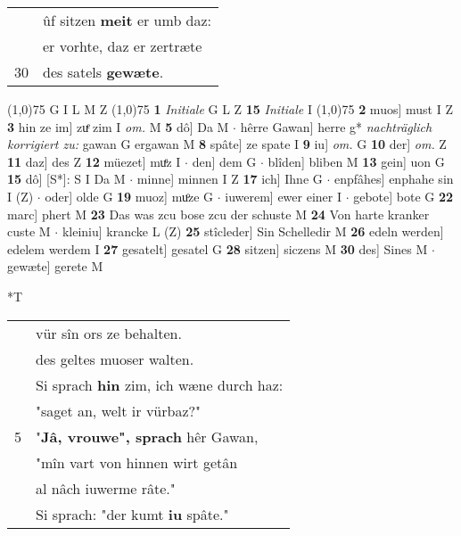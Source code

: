 \documentclass[8pt,a4paper,notitlepage]{article}
\begin{document}
\begin{table}[ht]
\begin{minipage}[t]{0.5\linewidth}
\begin{tabular}{rl}
 & ûf sitzen \textbf{meit} er umb daz:\\ 
 & er vorhte, daz er zertræte\\ 
30 & des satels \textbf{gewæte}.\\ 
\end{tabular}
\scriptsize
\line(1,0){75} \newline
G I L M Z \newline
\line(1,0){75} \newline
\textbf{1} \textit{Initiale} G L Z  \textbf{15} \textit{Initiale} I  \newline
\line(1,0){75} \newline
\textbf{2} muos] must I Z \textbf{3} hin ze im] zuͤ zim I \textit{om.} M \textbf{5} dô] Da M  $\cdot$ hêrre Gawan] herre g* \textit{nachträglich korrigiert zu:} gawan G ergawan M \textbf{8} spâte] ze spate I \textbf{9} iu] \textit{om.} G \textbf{10} der] \textit{om.} Z \textbf{11} daz] des Z \textbf{12} müezet] muͤz I  $\cdot$ den] dem G  $\cdot$ blîden] bliben M \textbf{13} gein] uon G \textbf{15} dô] [S*]: S I Da M  $\cdot$ minne] minnen I Z \textbf{17} ich] Ihne G  $\cdot$ enpfâhes] enphahe sin I (Z)  $\cdot$ oder] olde G \textbf{19} muoz] muͦze G  $\cdot$ iuwerem] ewer einer I  $\cdot$ gebote] bote G \textbf{22} marc] phert M \textbf{23} Das was zcu bose zcu der schuste M \textbf{24} Von harte kranker custe M  $\cdot$ kleiniu] krancke L (Z) \textbf{25} stîcleder] Sin Schelledir M \textbf{26} edeln werden] edelem werdem I \textbf{27} gesatelt] gesatel G \textbf{28} sitzen] siczens M \textbf{30} des] Sines M  $\cdot$ gewæte] gerete M \newline
\end{minipage}
\hspace{0.5cm}
\begin{minipage}[t]{0.5\linewidth}
\small
\begin{center}*T
\end{center}
\begin{tabular}{rl}
 & vür sîn ors ze behalten.\\ 
 & des geltes muoser walten.\\ 
 & Si sprach \textbf{hin} zim, ich wæne durch haz:\\ 
 & "saget an, welt ir vürbaz?"\\ 
5 & "\textbf{Jâ, vrouwe", sprach} hêr Gawan,\\ 
 & "mîn vart von hinnen wirt getân\\ 
 & al nâch iuwerme râte."\\ 
 & Si sprach: "der kumt \textbf{iu} spâte."\\ 

\end{tabular}
\end{minipage}
\end{table}
\end{document}
